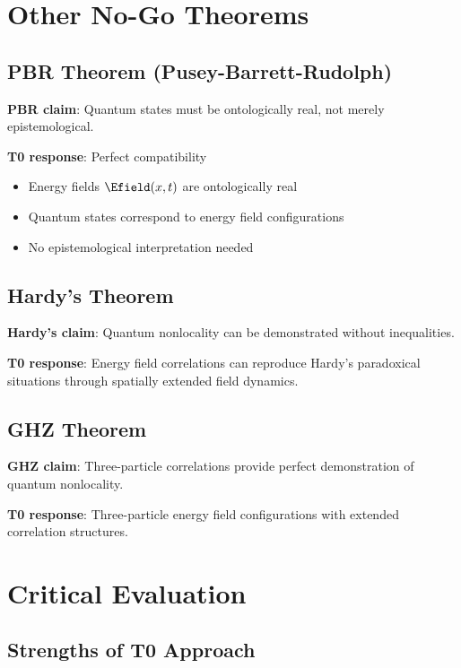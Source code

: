 	\section{Other No-Go Theorems}
	
	\subsection{PBR Theorem (Pusey-Barrett-Rudolph)}
	
	\textbf{PBR claim}: Quantum states must be ontologically real, not merely epistemological.
	
	\textbf{T0 response}: Perfect compatibility
	\begin{itemize}
		\item Energy fields $\Efield(x,t)$ are ontologically real
		\item Quantum states correspond to energy field configurations
		\item No epistemological interpretation needed
	\end{itemize}
	
	\subsection{Hardy's Theorem}
	
	\textbf{Hardy's claim}: Quantum nonlocality can be demonstrated without inequalities.
	
	\textbf{T0 response}: Energy field correlations can reproduce Hardy's paradoxical situations through spatially extended field dynamics.
	
	\subsection{GHZ Theorem}
	
	\textbf{GHZ claim}: Three-particle correlations provide perfect demonstration of quantum nonlocality.
	
	\textbf{T0 response}: Three-particle energy field configurations with extended correlation structures.
	
	\section{Critical Evaluation}
	
	\subsection{Strengths of T0 Approach}
	
